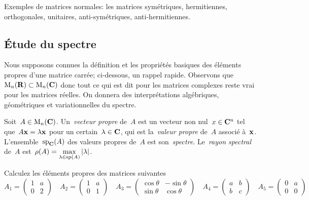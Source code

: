 Exemples de matrices normales: les matrices symétriques,
hermitiennes, orthogonales, unitaires, anti-symétriques, anti-hermitiennes.




%

\subsection{Étude du spectre}

Nous supposons connues la définition et les propriétés basiques des éléments
propres d'une matrice carrée; ci-dessous, un rappel rapide.  Observons
que~$\mathrm{M}_n(\mathbf{R})\subset \mathrm{M}_n(\mathbf{C})$ donc tout ce qui est dit pour les matrices
complexes reste vrai pour les matrices réelles.
On donnera des interprétations algébriques, géométriques et variationnelles
du spectre.

\begin{definition}
	Soit~$A\in\mathrm{M}_n(\mathbf{C})$.  Un~\emph{vecteur propre} de~$A$ est un vecteur non
	nul~$x\in\mathbf{C}^n$ tel que~$A\mathbf{x}=\lambda\mathbf{x}$ pour un certain~$\lambda\in\mathbf{C}$, qui
	est la~\emph{valeur propre} de~$A$ associé à~$\mathbf{x}$.
	L'ensemble~$\mathrm{sp}_{\mathbf{C}}(A)$ des valeurs propres de~$A$ est
	son~\emph{spectre}.  Le~\emph{rayon spectral} de~$A$
	est~$\displaystyle\rho(A)=\max_{\lambda\in\mathrm{sp}(A)}\left|\lambda\right|$.
\end{definition}

\begin{exercice}
	\label{ex:eigs2x2}
	Calculez les éléments propres des matrices suivantes
	\[
		A_1\!=\!\begin{pmatrix}1&a\\0&2\end{pmatrix}
		\quad
		A_2\!=\!\begin{pmatrix}1&a\\0&1\end{pmatrix}
		\quad
		A_3\!=\!\begin{pmatrix}\cos\theta&-\sin\theta\\\sin\theta&\cos\theta\end{pmatrix}
		\quad
		A_4\!=\!\begin{pmatrix}a&b\\b&c\end{pmatrix}
		\quad
		A_5\!=\!\begin{pmatrix}0&a\\0&0\end{pmatrix}
	\]
\end{exercice}

